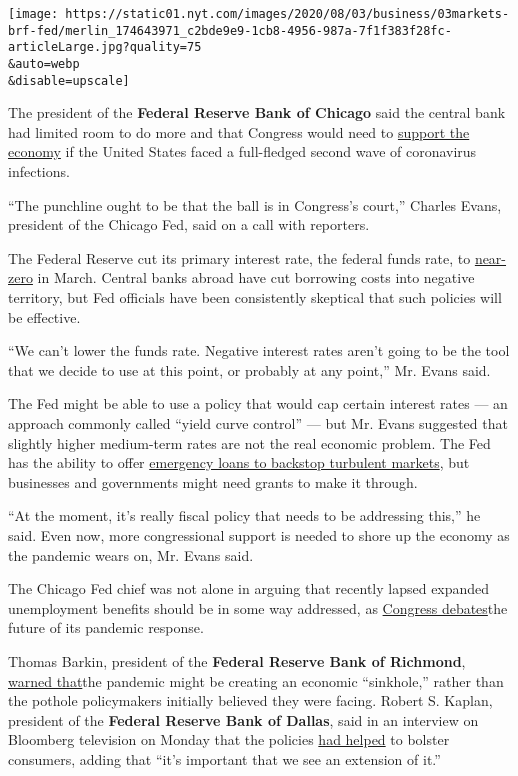 \texttt{[image: https://static01.nyt.com/images/2020/08/03/business/03markets-brf-fed/merlin\_174643971\_c2bde9e9-1cb8-4956-987a-7f1f383f28fc-articleLarge.jpg?quality=75\\\&auto=webp\\\&disable=upscale]}

The president of the \textbf{Federal Reserve Bank of Chicago} said the
central bank had limited room to do more and that Congress would need to
\href{https://www.nytimes.com/2020/08/03/business/fed-official-says-a-hard-lockdown-could-get-virus-under-control.html}{support
the economy} if the United States faced a full-fledged second wave of
coronavirus infections.

``The punchline ought to be that the ball is in Congress's court,''
Charles Evans, president of the Chicago Fed, said on a call with
reporters.

The Federal Reserve cut its primary interest rate, the federal funds
rate, to
\href{https://www.nytimes.com/2020/07/29/business/economy/federal-reserve-meeting-interest-rates.html}{near-zero}
in March. Central banks abroad have cut borrowing costs into negative
territory, but Fed officials have been consistently skeptical that such
policies will be effective.

``We can't lower the funds rate. Negative interest rates aren't going to
be the tool that we decide to use at this point, or probably at any
point,'' Mr. Evans said.

The Fed might be able to use a policy that would cap certain interest
rates --- an approach commonly called ``yield curve control'' --- but
Mr. Evans suggested that slightly higher medium-term rates are not the
real economic problem. The Fed has the ability to offer
\href{https://www.nytimes.com/2020/07/28/business/economy/coronavirus-federal-reserve-policy.html}{emergency
loans to backstop turbulent markets}, but businesses and governments
might need grants to make it through.

``At the moment, it's really fiscal policy that needs to be addressing
this,'' he said. Even now, more congressional support is needed to shore
up the economy as the pandemic wears on, Mr. Evans said.

The Chicago Fed chief was not alone in arguing that recently lapsed
expanded unemployment benefits should be in some way addressed, as
\href{https://www.nytimes.com/2020/08/02/us/politics/coronavirus-jobless-aid.html}{Congress
debates}the future of its pandemic response.

Thomas Barkin, president of the \textbf{Federal Reserve Bank of
Richmond},
\href{https://www.reuters.com/article/usa-fed-barkin/feds-barkin-says-economy-faces-sinkhole-without-more-fiscal-support-idUSW1N2B8003}{warned
that}the pandemic might be creating an economic ``sinkhole,'' rather
than the pothole policymakers initially believed they were facing.
Robert S. Kaplan, president of the \textbf{Federal Reserve Bank of
Dallas}, said in an interview on Bloomberg television on Monday that the
policies
\href{https://www.bloomberg.com/news/articles/2020-08-03/extension-of-jobless-benefits-to-buoy-growth-fed-s-kaplan-says?srnd=premium\&sref=oZtxD6sa}{had
helped} to bolster consumers, adding that ``it's important that we see
an extension of it.''

